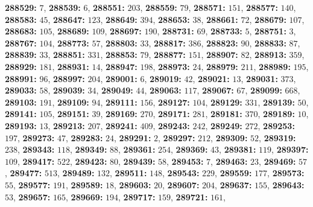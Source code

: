 \textsf{\bfseries 288529:} $7$, \textsf{\bfseries 288539:} $6$, \textsf{\bfseries 288551:} $203$, \textsf{\bfseries 288559:} $79$, \textsf{\bfseries 288571:} $151$, \textsf{\bfseries 288577:} $140$, \textsf{\bfseries 288583:} $45$, \textsf{\bfseries 288647:} $123$, \textsf{\bfseries 288649:} $394$, \textsf{\bfseries 288653:} $38$, \textsf{\bfseries 288661:} $72$, \textsf{\bfseries 288679:} $107$, \textsf{\bfseries 288683:} $105$, \textsf{\bfseries 288689:} $109$, \textsf{\bfseries 288697:} $190$, \textsf{\bfseries 288731:} $69$, \textsf{\bfseries 288733:} $5$, \textsf{\bfseries 288751:} $3$, \textsf{\bfseries 288767:} $104$, \textsf{\bfseries 288773:} $57$, \textsf{\bfseries 288803:} $33$, \textsf{\bfseries 288817:} $386$, \textsf{\bfseries 288823:} $90$, \textsf{\bfseries 288833:} $87$, \textsf{\bfseries 288839:} $33$, \textsf{\bfseries 288851:} $331$, \textsf{\bfseries 288853:} $79$, \textsf{\bfseries 288877:} $151$, \textsf{\bfseries 288907:} $82$, \textsf{\bfseries 288913:} $359$, \textsf{\bfseries 288929:} $181$, \textsf{\bfseries 288931:} $14$, \textsf{\bfseries 288947:} $198$, \textsf{\bfseries 288973:} $24$, \textsf{\bfseries 288979:} $211$, \textsf{\bfseries 288989:} $195$, \textsf{\bfseries 288991:} $96$, \textsf{\bfseries 288997:} $204$, \textsf{\bfseries 289001:} $6$, \textsf{\bfseries 289019:} $42$, \textsf{\bfseries 289021:} $13$, \textsf{\bfseries 289031:} $373$, \textsf{\bfseries 289033:} $58$, \textsf{\bfseries 289039:} $34$, \textsf{\bfseries 289049:} $44$, \textsf{\bfseries 289063:} $117$, \textsf{\bfseries 289067:} $67$, \textsf{\bfseries 289099:} $668$, \textsf{\bfseries 289103:} $191$, \textsf{\bfseries 289109:} $94$, \textsf{\bfseries 289111:} $156$, \textsf{\bfseries 289127:} $104$, \textsf{\bfseries 289129:} $331$, \textsf{\bfseries 289139:} $50$, \textsf{\bfseries 289141:} $105$, \textsf{\bfseries 289151:} $39$, \textsf{\bfseries 289169:} $270$, \textsf{\bfseries 289171:} $281$, \textsf{\bfseries 289181:} $370$, \textsf{\bfseries 289189:} $10$, \textsf{\bfseries 289193:} $13$, \textsf{\bfseries 289213:} $207$, \textsf{\bfseries 289241:} $409$, \textsf{\bfseries 289243:} $242$, \textsf{\bfseries 289249:} $272$, \textsf{\bfseries 289253:} $197$, \textsf{\bfseries 289273:} $47$, \textsf{\bfseries 289283:} $24$, \textsf{\bfseries 289291:} $2$, \textsf{\bfseries 289297:} $212$, \textsf{\bfseries 289309:} $52$, \textsf{\bfseries 289319:} $238$, \textsf{\bfseries 289343:} $118$, \textsf{\bfseries 289349:} $88$, \textsf{\bfseries 289361:} $254$, \textsf{\bfseries 289369:} $43$, \textsf{\bfseries 289381:} $119$, \textsf{\bfseries 289397:} $109$, \textsf{\bfseries 289417:} $522$, \textsf{\bfseries 289423:} $80$, \textsf{\bfseries 289439:} $58$, \textsf{\bfseries 289453:} $7$, \textsf{\bfseries 289463:} $23$, \textsf{\bfseries 289469:} $57$, \textsf{\bfseries 289477:} $513$, \textsf{\bfseries 289489:} $132$, \textsf{\bfseries 289511:} $148$, \textsf{\bfseries 289543:} $229$, \textsf{\bfseries 289559:} $177$, \textsf{\bfseries 289573:} $55$, \textsf{\bfseries 289577:} $191$, \textsf{\bfseries 289589:} $18$, \textsf{\bfseries 289603:} $20$, \textsf{\bfseries 289607:} $204$, \textsf{\bfseries 289637:} $155$, \textsf{\bfseries 289643:} $53$, \textsf{\bfseries 289657:} $165$, \textsf{\bfseries 289669:} $194$, \textsf{\bfseries 289717:} $159$, \textsf{\bfseries 289721:} $161$, 
